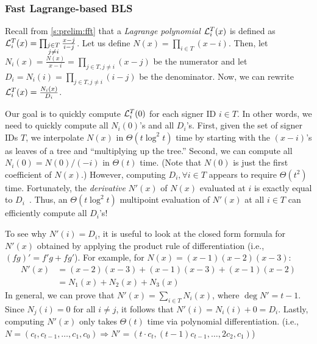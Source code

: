 \subsubsection{Fast Lagrange-based BLS}
\label{s:threshsig:fast-lagr}
Recall from \cref{s:prelim:fft} that a \textit{Lagrange polynomial} $\mathcal{L}_i^T(x)$ is defined as $\mathcal{L}_i^T(x) = \prod_{\substack{j\in T\\j\ne i}}\frac{x-j}{i-j}$.
Let us define $N(x) = \prod_{i\in T}{(x-i)}$.
Then, let $N_i(x) = \frac{N(x)}{x-i} = \prod_{j\in T,j\ne i} {(x-j)}$ be the numerator and let $D_i = N_i(i) = \prod_{j\in T,j\ne i} {(i - j)}$ be the denominator.
Now, we can rewrite $\mathcal{L}_i^T(x) = \frac{N_i(x)}{D_i}$.

Our goal is to quickly compute $\mathcal{L}_i^T(0)$ for each signer ID $i\in T$.
In other words, we need to quickly compute all $N_i(0)$'s and all $D_i$'s.
First, given the set of signer IDs $T$, we interpolate $N(x)$ in $\Theta(t\log^2{t})$ time by starting with the $(x-i)$'s as leaves of a tree and ``multiplying up the tree.''
Second, we can compute all $N_i(0) = N(0) / (-i)$ in $\Theta(t)$ time.
(Note that $N(0)$ is just the first coefficient of $N(x)$.)
However, computing $D_i,\forall i\in T$ appears to require $\Theta(t^2)$ time.
Fortunately, the \textit{derivative} $N'(x)$ of $N(x)$ evaluated at $i$ is exactly equal to $D_i$~\cite{moderncomputeralgebra-ch10}.
Thus, an $\Theta(t\log^2{t})$ multipoint evaluation of $N'(x)$ at all $i\in T$ can efficiently compute all $D_i$'s!

To see why $N'(i) = D_i$, it is useful to look at the closed form formula for $N'(x)$ obtained by applying the product rule of differentiation (i.e., $(fg)' = f'g + fg'$).
For example, for $N(x) = (x-1)(x-2)(x-3)$:
\begin{align*}
N'(x)
&= (x-2)(x-3) + (x-1)(x-3) + (x-1)(x-2)\\
&= N_1(x) + N_2(x) + N_3(x)
\end{align*}
In general, we can prove that $N'(x) = \sum_{i\in T} N_i(x)$, where $\deg{N'} = t-1$.
Since $N_j(i) = 0$ for all $i\ne j$, it follows that $N'(i) = N_i(i) + 0 = D_i$.
Lastly, computing $N'(x)$ only takes $\Theta(t)$ time via polynomial differentiation.
(i.e., $N = (c_t, c_{t-1}, \dots, c_1, c_0) \Rightarrow N' = (t \cdot c_t, (t-1) c_{t-1}, \dots, 2  c_2, c_1)$)

